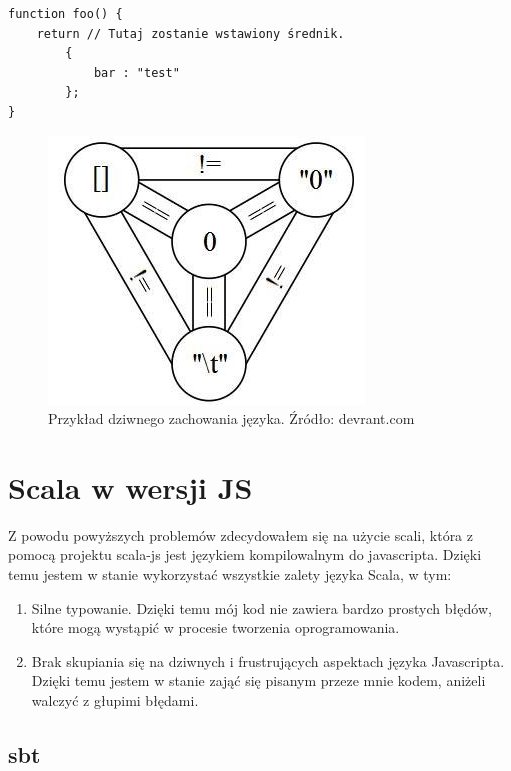 \begin{lstlisting}[label={lst:javascriptSUCKS},
frame=single, numbers=none,captionpos=b, 
caption={Przykład niepoprawnego kodu Javascript wynikłego z automatycznego wstawienia średnika}]
function foo() {
    return // Tutaj zostanie wstawiony średnik.
        {
            bar : "test"
        };
}
\end{lstlisting}



\begin{figure}[h]
	\centering
	\includegraphics{images/javagod.png}
	 \caption{Przykład dziwnego zachowania języka. Źródło: devrant.com}
\end{figure}


\section{Scala w wersji JS}

Z powodu powyższych problemów zdecydowałem się na użycie scali, która z pomocą projektu scala-js\cite{ScalaJS} jest językiem kompilowalnym do javascripta. 
Dzięki temu jestem w stanie wykorzystać wszystkie zalety języka Scala, w tym:
\begin{enumerate}
	\item Silne typowanie. Dzięki temu mój kod nie zawiera bardzo prostych błędów, które mogą wystąpić w procesie tworzenia oprogramowania.
	\item Brak skupiania się na dziwnych i frustrujących aspektach języka Javascripta. Dzięki temu jestem w stanie zająć się pisanym przeze mnie kodem, aniżeli walczyć z głupimi błędami.
\end{enumerate}


\subsection{sbt}
	

